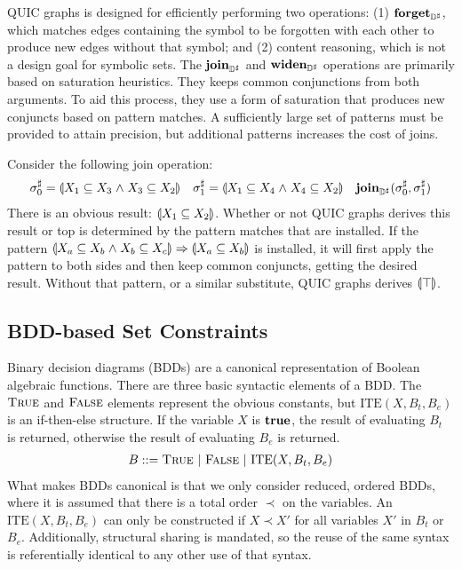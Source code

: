QUIC graphs is designed for efficiently performing two operations: (1) $\textbf{forget}_{{\mathbb{D}}^{\sharp}}$, which matches edges containing the symbol to be forgotten with each other to produce new edges without that symbol; and (2) content reasoning, which is not a design goal for symbolic sets.  The $\textbf{join}_{{\mathbb{D}}^{\sharp}}$ and $\textbf{widen}_{{\mathbb{D}}^{\sharp}}$ operations are primarily based on saturation heuristics.  They keeps common conjunctions from both arguments.  To aid this process, they use a form of saturation that produces new conjuncts based on pattern matches.  A sufficiently large set of patterns must be provided to attain precision, but additional patterns increases the cost of joins.
\begin{example} \label{ex:Qjoin}  Consider the following join operation:
    \begin{align*}
      {\sigma}^{\sharp}_0 &= \llparenthesis X_1 \subseteq X_3 \mathrel{\wedge} X_3 \subseteq X_2 \rrparenthesis &
      {\sigma}^{\sharp}_1 &= \llparenthesis X_1 \subseteq X_4 \mathrel{\wedge} X_4 \subseteq X_2 \rrparenthesis &
      \textbf{join}_{{\mathbb{D}}^{\sharp}}({\sigma}^{\sharp}_0, {\sigma}^{\sharp}_1 )
    \end{align*}
    There is an obvious result: $\llparenthesis X_1 \subseteq X_2 \rrparenthesis$.  Whether or not QUIC graphs derives this result or top is determined by the pattern matches that are installed.  If the pattern $\llparenthesis X_a \subseteq X_b \mathrel{\wedge} X_b \subseteq X_c \rrparenthesis \Rightarrow \llparenthesis X_a \subseteq X_b \rrparenthesis$ is installed, it will first apply the pattern to both sides and then keep common conjuncts, getting the desired result.  Without that pattern, or a similar substitute, QUIC graphs derives $\llparenthesis \top \rrparenthesis$.
\end{example}

\subsection{BDD-based Set Constraints}
\label{s:4:3:bdd}
Binary decision diagrams (BDDs) are a canonical representation of Boolean algebraic functions.  There are three basic syntactic elements of a BDD.  The $\textsc{True}$ and $\textsc{False}$ elements represent the obvious constants, but $\textrm{ITE}(X,B_t,B_e)$ is an if-then-else structure.  If the variable $X$ is $\mathbf{true}$, the result of evaluating $B_t$ is returned, otherwise the result of evaluating $B_e$ is returned.
\begin{align*}
  B ::= \textsc{True} \ | \ \textsc{False} \ | \ \textrm{ITE}(X,B_t,B_e)
\end{align*}
What makes BDDs canonical is that we only consider reduced, ordered BDDs, where it is assumed that there is a total order $\prec$ on the variables.  An $\textrm{ITE}(X,B_t,B_e)$ can only be constructed if $X \prec X'$ for all variables $X'$ in $B_t$ or $B_e$.  Additionally, structural sharing is mandated, so the reuse of the same syntax is referentially identical to any other use of that syntax.

